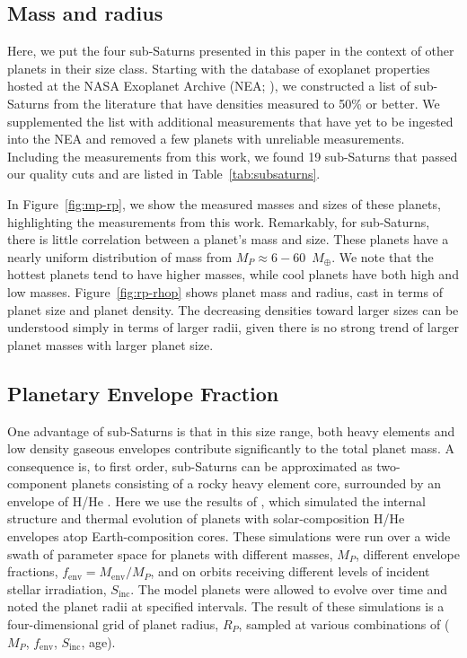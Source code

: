 \documentclass[preprint2]{aastex6}
\newcommand{\Mp}{\ensuremath{M_{P}}\xspace}
\newcommand{\Menv}{\ensuremath{M_{\mathrm{env}}}\xspace}
\newcommand{\fenv}{\ensuremath{f_{\mathrm{env}}}\xspace}
\newcommand{\Rp}{\ensuremath{R_P}\xspace}
\newcommand{\Sinc}{\ensuremath{S_{\mathrm{inc}}}\xspace}
\newcommand{\Me}{\ensuremath{M_{\oplus}}\xspace}
\begin{document}
\subsection{Mass and radius}
\label{ssec:mass-and-radius}
Here, we put the four sub-Saturns presented in this paper in the context of other planets in their size class. Starting with the database of exoplanet properties hosted at the NASA Exoplanet Archive (NEA; \citealt{Akeson13}), we constructed a list of sub-Saturns from the literature that have densities measured to 50\% or better. We supplemented the list with additional measurements that have yet to be ingested into the NEA and removed a few planets with unreliable measurements. Including the measurements from this work, we found 19 sub-Saturns that passed our quality cuts and are listed in Table~\ref{tab:subsaturns}.

In Figure~\ref{fig:mp-rp}, we show the measured masses and sizes of these planets, highlighting the measurements from this work. Remarkably, for sub-Saturns, there is little correlation between a planet's mass and size. These planets have a nearly uniform distribution of mass from $\Mp \approx 6-60$~\Me. We note that the hottest planets tend to have higher masses, while cool planets have both high and low masses. Figure~\ref{fig:rp-rhop} shows planet mass and radius, cast in terms of planet size and planet density. The decreasing densities toward larger sizes can be understood simply in terms of larger radii, given there is no strong trend of larger planet masses with larger planet size.

\subsection{Planetary Envelope Fraction}
\label{ssec:cmf}
One advantage of sub-Saturns is that in this size range, both heavy elements and low density gaseous envelopes contribute significantly to the total planet mass. A consequence is, to first order, sub-Saturns can be approximated as two-component planets consisting of a rocky heavy element core, surrounded by an envelope of H/He \citep{Lopez14,Petigura16}. Here we use the results of \cite{Lopez14}, which simulated the internal structure and thermal evolution of planets with solar-composition H/He envelopes atop Earth-composition cores. These simulations were run over a wide swath of parameter space for planets with different masses, \Mp, different envelope fractions, $\fenv = \Menv / \Mp$, and on orbits receiving different levels of incident stellar irradiation, \Sinc. The model planets were allowed to evolve over time and \cite{Lopez14} noted the planet radii at specified intervals. The result of these simulations is a four-dimensional grid of planet radius, \Rp, sampled at various combinations of (\Mp, \fenv, \Sinc, age). 
\end{document}

